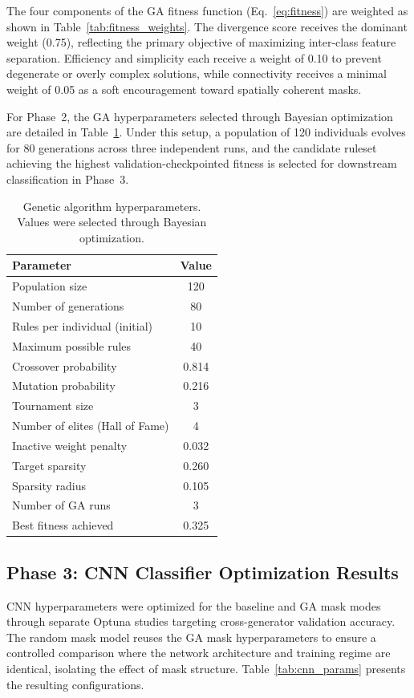 \documentclass[runningheads]{llncs}
\begin{document}
The four components of the GA fitness function (Eq.~\ref{eq:fitness}) are weighted as shown in Table~\ref{tab:fitness_weights}. The divergence score receives the dominant weight (0.75), reflecting the primary objective of maximizing inter-class feature separation. Efficiency and simplicity each receive a weight of 0.10 to prevent degenerate or overly complex solutions, while connectivity receives a minimal weight of 0.05 as a soft encouragement toward spatially coherent masks.

For Phase~2, the GA hyperparameters selected through Bayesian optimization are detailed in Table~\ref{tab:ga_params}. Under this setup, a population of 120 individuals evolves for 80 generations across three independent runs, and the candidate ruleset achieving the highest validation-checkpointed fitness is selected for downstream classification in Phase~3.

\begin{table}[!htbp]
\centering
\caption{Genetic algorithm hyperparameters. Values were selected through Bayesian optimization.}
\label{tab:ga_params}
\begin{tabular}{@{}lc@{}}
\toprule
Parameter & Value \\
\midrule
Population size & 120 \\
Number of generations & 80 \\
Rules per individual (initial) & 10 \\
Maximum possible rules & 40 \\
Crossover probability & 0.814 \\
Mutation probability & 0.216 \\
Tournament size & 3 \\
Number of elites (Hall of Fame) & 4 \\
Inactive weight penalty & 0.032 \\
Target sparsity & 0.260 \\
Sparsity radius & 0.105 \\
Number of GA runs & 3 \\
Best fitness achieved & 0.325 \\
\bottomrule
\end{tabular}
\end{table}

\subsection{Phase 3: CNN Classifier Optimization Results}

CNN hyperparameters were optimized for the baseline and GA mask modes through separate Optuna studies targeting cross-generator validation accuracy. The random mask model reuses the GA mask hyperparameters to ensure a controlled comparison where the network architecture and training regime are identical, isolating the effect of mask structure. Table~\ref{tab:cnn_params} presents the resulting configurations.
\end{document}
